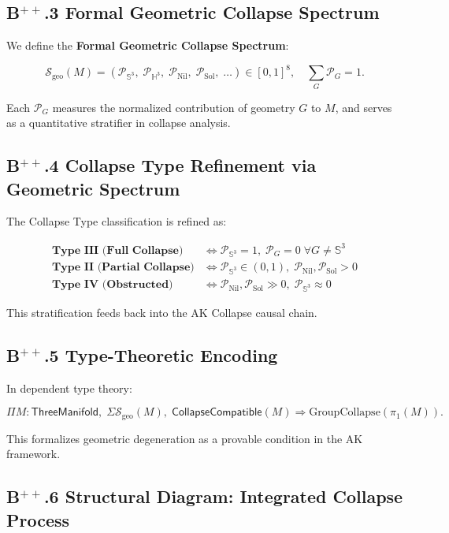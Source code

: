 \documentclass[11pt]{article}
\begin{document}
\subsection*{B$^{++}$.3 Formal Geometric Collapse Spectrum}

We define the \textbf{Formal Geometric Collapse Spectrum}:

\[
\mathcal{S}_{\mathrm{geo}}(M) = \left( \mathcal{P}_{\mathbb{S}^3},\; \mathcal{P}_{\mathbb{H}^3},\; \mathcal{P}_{\mathrm{Nil}},\; \mathcal{P}_{\mathrm{Sol}},\; \ldots \right) \in [0,1]^8,\quad \sum_G \mathcal{P}_G = 1.
\]

Each $\mathcal{P}_G$ measures the normalized contribution of geometry $G$ to $M$, and serves as a quantitative stratifier in collapse analysis.

\subsection*{B$^{++}$.4 Collapse Type Refinement via Geometric Spectrum}

The Collapse Type classification is refined as:

\[
\begin{array}{ll}
\textbf{Type III (Full Collapse)} & \iff \mathcal{P}_{\mathbb{S}^3} = 1,\; \mathcal{P}_G = 0\; \forall G \neq \mathbb{S}^3 \\
\textbf{Type II (Partial Collapse)} & \iff \mathcal{P}_{\mathbb{S}^3} \in (0,1),\; \mathcal{P}_{\mathrm{Nil}}, \mathcal{P}_{\mathrm{Sol}} > 0 \\
\textbf{Type IV (Obstructed)} & \iff \mathcal{P}_{\mathrm{Nil}}, \mathcal{P}_{\mathrm{Sol}} \gg 0,\; \mathcal{P}_{\mathbb{S}^3} \approx 0
\end{array}
\]

This stratification feeds back into the AK Collapse causal chain.

\subsection*{B$^{++}$.5 Type-Theoretic Encoding}

In dependent type theory:

\[
\Pi M : \mathsf{ThreeManifold},\; \Sigma \mathcal{S}_{\mathrm{geo}}(M),\; \mathsf{CollapseCompatible}(M) \Rightarrow \mathrm{GroupCollapse}(\pi_1(M)).
\]

This formalizes geometric degeneration as a provable condition in the AK framework.

\subsection*{B$^{++}$.6 Structural Diagram: Integrated Collapse Process}
\end{document}
